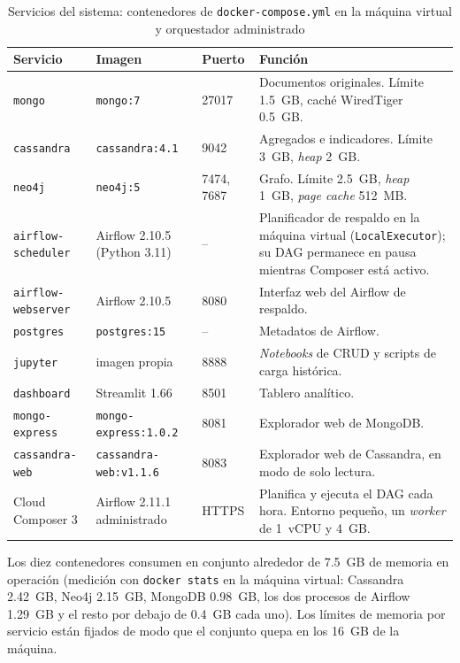\begin{table}[H]
\centering
\caption{Servicios del sistema: contenedores de \texttt{docker-compose.yml} en la máquina virtual y orquestador administrado}
\label{tab:servicios}
\vspace{0.2cm}
\footnotesize
\begin{tabular}{@{}lllp{5.5cm}@{}}
\toprule
\textbf{Servicio} & \textbf{Imagen} & \textbf{Puerto} & \textbf{Función} \\
\midrule
\texttt{mongo}             & \texttt{mongo:7}           & 27017 & Documentos originales. Límite 1.5~GB, caché WiredTiger 0.5~GB. \\
\texttt{cassandra}         & \texttt{cassandra:4.1}     & 9042  & Agregados e indicadores. Límite 3~GB, \textit{heap} 2~GB. \\
\texttt{neo4j}             & \texttt{neo4j:5}           & 7474, 7687 & Grafo. Límite 2.5~GB, \textit{heap} 1~GB, \textit{page cache} 512~MB. \\
\texttt{airflow-scheduler} & Airflow 2.10.5 (Python 3.11) & --  & Planificador de respaldo en la máquina virtual (\texttt{LocalExecutor}); su DAG permanece en pausa mientras Composer está activo. \\
\texttt{airflow-webserver} & Airflow 2.10.5             & 8080  & Interfaz web del Airflow de respaldo. \\
\texttt{postgres}          & \texttt{postgres:15}       & --    & Metadatos de Airflow. \\
\texttt{jupyter}           & imagen propia              & 8888  & \textit{Notebooks} de CRUD y scripts de carga histórica. \\
\texttt{dashboard}         & Streamlit 1.66             & 8501  & Tablero analítico. \\
\texttt{mongo-express}     & \texttt{mongo-express:1.0.2} & 8081 & Explorador web de MongoDB. \\
\texttt{cassandra-web}     & \texttt{cassandra-web:v1.1.6} & 8083 & Explorador web de Cassandra, en modo de solo lectura. \\
\midrule
Cloud Composer 3           & Airflow 2.11.1 administrado & HTTPS & Planifica y ejecuta el DAG cada hora. Entorno pequeño, un \textit{worker} de 1~vCPU y 4~GB. \\
\bottomrule
\end{tabular}
\end{table}

Los diez contenedores consumen en conjunto alrededor de 7.5~GB de memoria en operación (medición con \texttt{docker stats} en la máquina virtual: Cassandra 2.42~GB, Neo4j 2.15~GB, MongoDB 0.98~GB, los dos procesos de Airflow 1.29~GB y el resto por debajo de 0.4~GB cada uno). Los límites de memoria por servicio están fijados de modo que el conjunto quepa en los 16~GB de la máquina.

